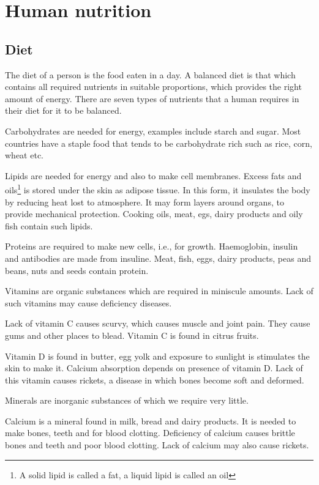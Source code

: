\section{Human nutrition}
\subsection{Diet}

The diet of a person is the food eaten in a day. A balanced diet is that which contains all
required nutrients in suitable proportions, which provides the right amount of energy.
There are seven types of nutrients that a human requires in their diet for it to be balanced.

Carbohydrates are needed for energy, examples include starch and sugar. Most countries have a 
staple food that tends to be carbohydrate rich such as rice, corn, wheat etc.

Lipids are needed for energy and also to make cell membranes. Excess fats and oils\footnote{A solid
lipid is called a fat, a liquid lipid is called an oil} is stored under the skin as adipose tissue.
In this form, it insulates the body by reducing heat lost to atmosphere. It may form layers around
organs, to provide mechanical protection. Cooking oils, meat, egs, dairy products and oily fish 
contain such lipids.

Proteins are required to make new cells, i.e., for growth. Haemoglobin, insulin and antibodies
are made from insuline. Meat, fish, eggs, dairy products, peas and beans, nuts and seeds contain
protein.

Vitamins are organic substances which are required in miniscule amounts. Lack of such vitamins
may cause deficiency diseases.

Lack of vitamin C causes scurvy, which causes muscle and joint pain. They cause gums and other
places to blead. Vitamin C is found in citrus fruits.

Vitamin D is found in butter, egg yolk and exposure to sunlight is stimulates the skin to make
it. Calcium absorption depends on presence of vitamin D. Lack of this vitamin causes rickets,
a disease in which bones become soft and deformed.

Minerals are inorganic substances of which we require very little.

Calcium is a mineral found in milk, bread and dairy products. It is needed to make bones, teeth
and for blood clotting. Deficiency of calcium causes brittle bones and teeth and poor blood 
clotting. Lack of calcium may also cause rickets.

